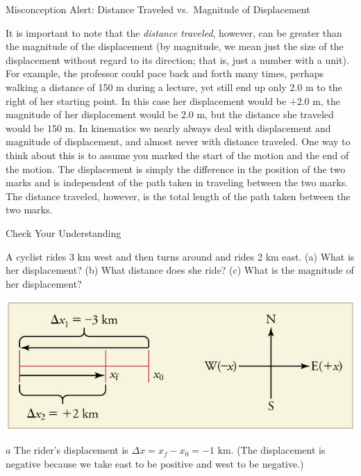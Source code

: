 \documentclass[
]{book}
\newenvironment{note}{}{}
\begin{document}
\hypertarget{fs-id3044492}{}
\begin{note}

Misconception Alert: Distance Traveled vs.~Magnitude of Displacement

It is important to note that the \emph{distance traveled},
\emph{}however, can be greater than the
magnitude of the displacement (by magnitude, we mean just the size of
the displacement without regard to its direction; that is, just a number
with a unit). For example, the professor could pace back and forth many
times, perhaps walking a distance of 150 m during a lecture, yet still
end up only 2.0 m to the right of her starting point. In this case her
displacement would be +2.0 m, the magnitude of her displacement would be
2.0 m, but the distance she traveled would be 150 m. In kinematics we
nearly always deal with displacement and magnitude of displacement, and
almost never with distance traveled. One way to think about this is to
assume you marked the start of the motion and the end of the motion. The
displacement is simply the difference in the position of the two marks
and is independent of the path taken in traveling between the two marks.
The distance traveled, however, is the total length of the path taken
between the two marks.

\end{note}

\hypertarget{fs-id3589986}{}
Check Your Understanding

\leavevmode\hypertarget{fs-id2996632}{}%
A cyclist rides 3 km west and then turns around and rides 2 km east. (a)
What is her displacement? (b) What distance does she ride? (c) What is
the magnitude of her displacement?

\leavevmode\hypertarget{fs-id1711333}{}%
\includegraphics{images/Figure_02_01_03.jpg}

\(a\) The rider's displacement is
\({{\Delta x = {x_{f} - x_{0}}} = \text{−1\ km}}{}\). (The displacement is
negative because we take east to be positive and west to be negative.)
\end{document}

